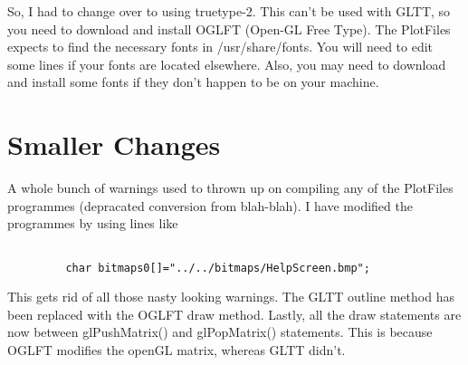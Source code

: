 \documentclass[12pt]{article}
\begin{document}
So, I had to change over to using truetype-2. This can't be used with GLTT, so you need to download and install OGLFT (Open-GL Free Type). The PlotFiles expects to find the necessary fonts in /usr/share/fonts. You will  need to edit some lines if your fonts are located elsewhere. Also, you may need to download and install some fonts if they don't happen to be on your machine.

\section{Smaller Changes}

A whole bunch of warnings used to thrown up on compiling any of the PlotFiles programmes (depracated conversion from blah-blah). I have modified the programmes by using lines like 
\begin{verbatim}

         char bitmaps0[]="../../bitmaps/HelpScreen.bmp";

\end{verbatim}
This gets rid of all those nasty looking warnings. The GLTT outline method has been replaced with the OGLFT draw method. Lastly, all the draw statements are now
between glPushMatrix() and glPopMatrix() statements. This is because OGLFT modifies the openGL matrix, whereas GLTT didn't.
\end{document}
